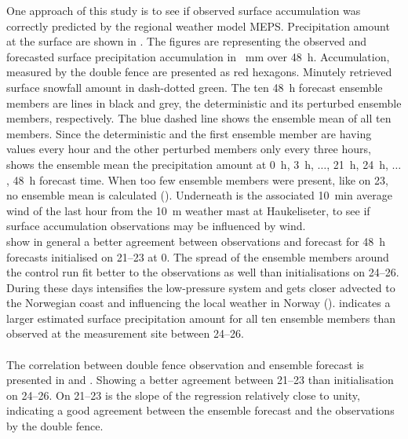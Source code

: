 One approach of this study is to see if observed surface accumulation was correctly predicted by the regional weather model MEPS. Precipitation amount at the surface are shown in . The figures are representing the observed and forecasted surface precipitation accumulation in \SI{}{\mm} over \SI{48}{\hour}. Accumulation, measured by the double fence are presented as red hexagons. Minutely retrieved surface snowfall amount in dash-dotted green. The ten \SI{48}{\hour} forecast ensemble members are lines in black and grey, the deterministic and its perturbed ensemble members, respectively. The blue dashed line shows the ensemble mean of all ten members. Since the deterministic and the first ensemble member are having values every hour and the other perturbed members only every three hours, shows the ensemble mean the precipitation amount at \SI{0}{\hour}, \SI{3}{\hour}, $\ldots$, \SI{21}{\hour}, \SI{24}{\hour}, $\ldots$, \SI{48}{\hour} forecast time. When too few ensemble members were present, like on \SI{23}{\dec}, no ensemble mean is calculated (). 
Underneath is the associated \SI{10}{\minute} average wind of the last hour from the \SI{10}{\metre} weather mast at Haukeliseter, to see if surface accumulation observations may be influenced by wind. 
\\
 show in general a better agreement between observations and forecast for \SI{48}{\hour} forecasts initialised on \SIrange{21}{23}{\dec} at \SI{0}{\UTC}. The spread of the ensemble members around the control run fit better to the observations as well than initialisations on \SIrange{24}{26}{\dec}. 
During these days intensifies the low-pressure system and gets closer advected to the Norwegian coast and influencing the local weather in Norway ().  indicates a larger estimated surface precipitation amount for all ten ensemble members than observed at the measurement site between \SIrange{24}{26}{\dec}. 
\\ 
\\
The correlation between double fence observation and ensemble forecast is presented in  and . Showing a better agreement between \SIrange{21}{23}{\dec} than initialisation on \SIrange{24}{26}{\dec}. On \SIrange{21}{23}{\dec} is the slope of the regression relatively close to unity, indicating a good agreement between the ensemble forecast and the observations by the double fence.
